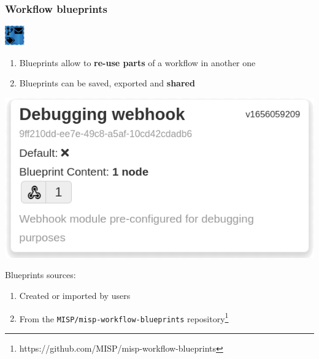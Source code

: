 \begin{frame}
    \frametitle{Workflow blueprints}
    \hspace*{0.9\textwidth}\includegraphics[width=32px]{pictures/blueprint-32.png}
    \vspace*{-2em}
    \begin{enumerate}
        \item Blueprints allow to \textbf{re-use parts} of a workflow in another one
        \item Blueprints can be saved, exported and \textbf{shared}
    \end{enumerate}
    \begin{center}
        \includegraphics[width=0.5\linewidth]{pictures/blueprint-debugging.png}
    \end{center}
    Blueprints sources:
    \begin{enumerate}
        \item Created or imported by users
        \item From the \texttt{MISP/misp-workflow-blueprints} repository\footnote{\scriptsize https://github.com/MISP/misp-workflow-blueprints}
    \end{enumerate}
\end{frame}

